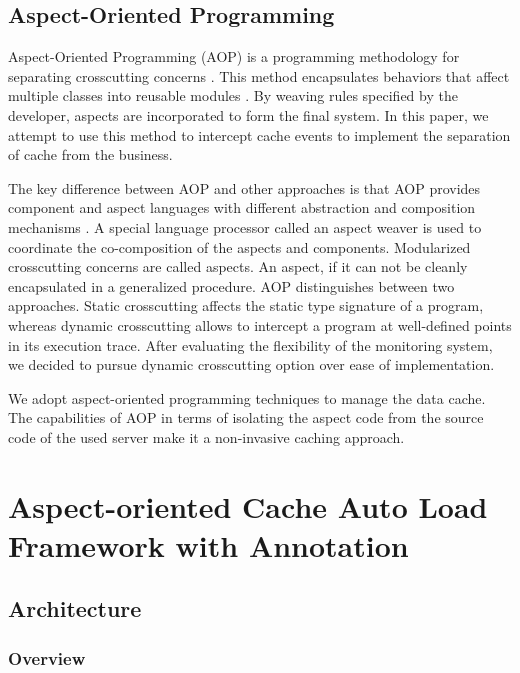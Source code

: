 \documentclass{singlecol-new}
\theoremstyle{TH}{
\newtheorem{lemma}{Lemma}
\newtheorem{theorem}[lemma]{Theorem}
\newtheorem{corrolary}[lemma]{Corrolary}
\newtheorem{conjecture}[lemma]{Conjecture}
\newtheorem{proposition}[lemma]{Proposition}
\newtheorem{claim}[lemma]{Claim}
\newtheorem{stheorem}[lemma]{Wrong Theorem}
}
\theoremstyle{THrm}{
\newtheorem{definition}{Definition}[section]
\newtheorem{question}{Question}[section]
\newtheorem{remark}{Remark}
\newtheorem{scheme}{Scheme}
}
\theoremstyle{THhit}{
\newtheorem{case}{Case}[section]
}
\begin{document}
\subsection{Aspect-Oriented Programming}
Aspect-Oriented Programming (AOP) is a programming methodology for separating crosscutting concerns \cite{kiczales2001aspect}. This method encapsulates behaviors that affect multiple classes into reusable modules \cite{ma2013toward}. By weaving rules specified by the developer, aspects are incorporated to form the final system. In this paper, we attempt to use this method to intercept cache events to implement the separation of cache from the business.

The key difference between AOP and other approaches is that AOP provides component and aspect languages with different abstraction and composition mechanisms \cite{pinto2017lara}. A special language processor called an aspect weaver is used to coordinate the co-composition of the aspects and components. Modularized crosscutting concerns are called aspects. An aspect, if it can not be cleanly encapsulated in a generalized procedure. AOP distinguishes between two approaches. Static crosscutting affects the static type signature of a program, whereas dynamic crosscutting allows to intercept a program at well-defined points in its execution trace. After evaluating the flexibility of the monitoring system, we decided to pursue dynamic crosscutting option over ease of implementation.

We adopt aspect-oriented programming techniques to manage the data cache. The capabilities of AOP in terms of isolating the aspect code from the source code of the used server make it a non-invasive caching approach.

\section{Aspect-oriented Cache Auto Load Framework with Annotation}
\label{Framework}

\subsection{Architecture}

\subsubsection{Overview}
\end{document}
